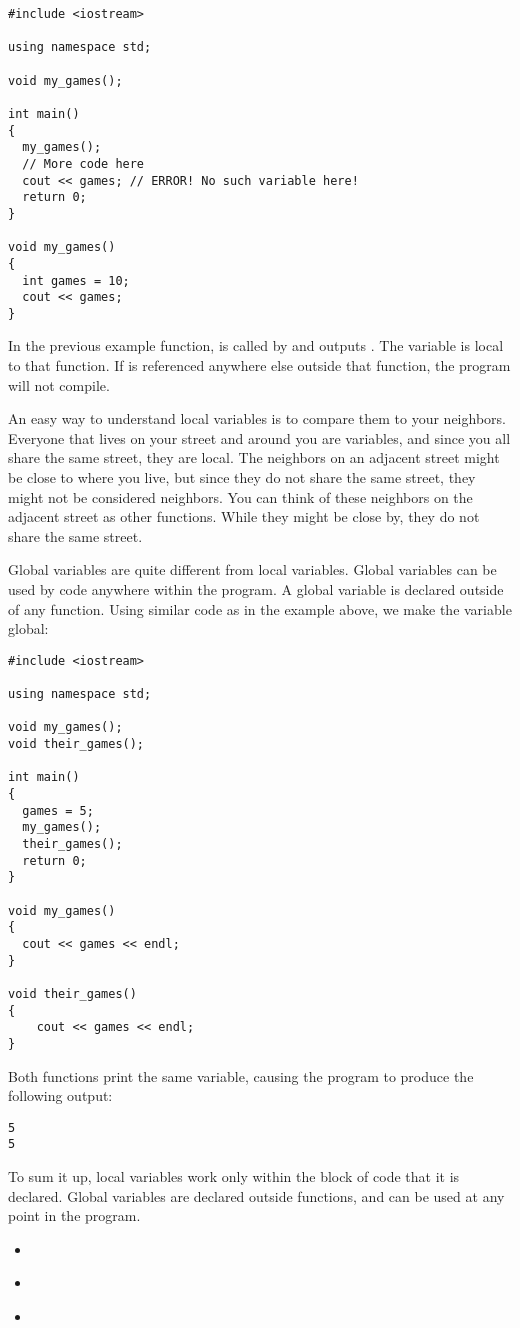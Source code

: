 \begin{lstlisting}
#include <iostream>

using namespace std;
	
void my_games();

int main()
{
  my_games();
  // More code here
  cout << games; // ERROR! No such variable here!
  return 0;
}

void my_games()
{
  int games = 10;
  cout << games;
}
\end{lstlisting}

In the previous example function,  is called by  and outputs .
The variable  is local to that function. 
If  is referenced anywhere else outside that function, the program will not compile.

An easy way to understand local variables is to compare them to your neighbors. 
Everyone that lives on your street and around you are variables, and since you all share the same street, they are local. 
The neighbors on an adjacent street might be close to where you live, but since they do not share the same street, they might not be considered neighbors. 
You can think of these neighbors on the adjacent street as other functions. 
While they might be close by, they do not share the same street.

Global variables are quite different from local variables. 
Global variables can be used by code anywhere within the program. 
A global variable is declared outside of any function. 
Using similar code as in the example above, we make the  variable global:

\begin{lstlisting}
#include <iostream>

using namespace std;

void my_games();
void their_games();

int main()
{
  games = 5;
  my_games();
  their_games();
  return 0;
}

void my_games()
{
  cout << games << endl;
}

void their_games()
{
	cout << games << endl;
}
\end{lstlisting}

Both functions print the same variable, causing the program to produce the following output: 

\begin{lstlisting}
5
5
\end{lstlisting}

To sum it up, local variables work only within the block of code that it is declared. 
Global variables are declared outside functions, and can be used at any point in the program.







\begin{itemize}
\item ~
\item ~
\item ~
\end{itemize}	





